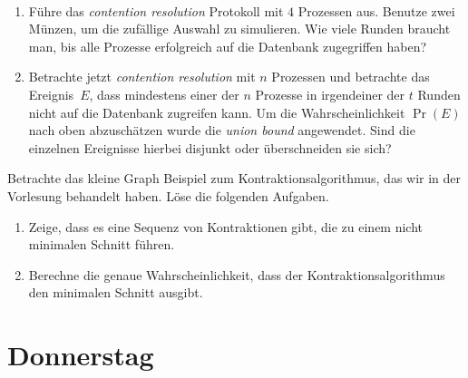 \documentclass{uebung_cs}
\begin{document}
\begin{aufgabe}\
	\begin{enumerate}
		\item 
		Führe das \textit{contention resolution} Protokoll mit $4$ Prozessen aus. Benutze zwei Münzen, um die zufällige Auswahl zu simulieren. Wie viele Runden braucht man, bis alle Prozesse erfolgreich auf die Datenbank zugegriffen haben?
		\item Betrachte jetzt \textit{contention resolution} mit $n$ Prozessen und betrachte das Ereignis~$E$, dass mindestens einer der $n$ Prozesse in irgendeiner der $t$ Runden nicht auf die Datenbank zugreifen kann.
		Um die Wahrscheinlichkeit $\Pr(E)$ nach oben abzuschätzen wurde die \textit{union bound} angewendet. Sind die einzelnen Ereignisse hierbei disjunkt oder überschneiden sie sich?
	\end{enumerate}
\end{aufgabe}    

\begin{aufgabe}[Minimaler Schnitt]
	Betrachte das \glqq kleine Graph\grqq{} Beispiel zum Kontraktionsalgorithmus, das wir in der Vorlesung behandelt haben. Löse die folgenden Aufgaben.
	\begin{center}
	\end{center}
	\begin{enumerate}
		\item Zeige, dass es eine Sequenz von Kontraktionen gibt, die zu einem nicht minimalen Schnitt führen.
		\item Berechne die genaue Wahrscheinlichkeit, dass der Kontraktionsalgorithmus den minimalen Schnitt ausgibt.
	\end{enumerate}
\end{aufgabe}

\section*{Donnerstag}
\end{document}
